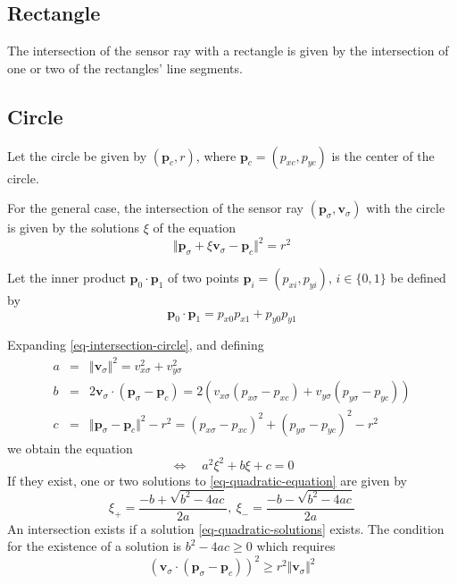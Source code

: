 \documentclass[11pt]{article}
\newcommand{\pb}{\mathbf{p}}
\newcommand{\pbc}{\mathbf{p}_c}
\newcommand{\pbsig}{\mathbf{p}_\sigma}
\newcommand{\pxc}{p_{xc}}
\newcommand{\pyc}{p_{yc}}
\newcommand{\pxsig}{p_{x\sigma}}
\newcommand{\pysig}{p_{y\sigma}}
\newcommand{\vbsig}{\mathbf{v}_\sigma}
\newcommand{\vxsig}{v_{x\sigma}}
\newcommand{\vysig}{v_{y\sigma}}
\begin{document}
\subsection{Rectangle}
\label{sec-intersection-rectangle}

The intersection of the sensor ray with a rectangle is given by the
intersection of one or two of the rectangles' line segments.

\subsection{Circle}
\label{sec-intersection-circle}
Let the circle be given by $(\pbc, r)$, where $\pbc=(\pxc, \pyc)$ is the 
center of the circle.

For the general case, the intersection of the sensor ray $(\pbsig, \vbsig)$
with the circle is given by the solutions $\xi$ of the equation
\begin{equation}
    \Vert\pbsig + \xi\vbsig - \pbc\Vert^2 = r^2\label{eq-intersection-circle}
\end{equation}

Let the inner product $\pb_0\cdot\pb_1$ of two points 
$\pb_i=(p_{xi},p_{yi}),\,i\in\{0,1\}$ be defined by
\begin{equation}
    \pb_0\cdot\pb_1 = p_{x0}p_{x1} + p_{y0}p_{y1}
\end{equation}

Expanding \eqref{eq-intersection-circle}, and defining
\begin{eqnarray}
    a &=& \Vert\vbsig\Vert^2 = \vxsig^2+\vysig^2 \\
    b &=& 2\vbsig\cdot(\pbsig-\pbc) = 
        2(\vxsig(\pxsig-\pxc)+\vysig(\pysig-\pyc)) \\
    c &=& \Vert\pbsig-\pbc\Vert^2 - r^2 = 
        (\pxsig-\pxc)^2 + (\pysig-\pyc)^2 - r^2
\end{eqnarray}
we obtain the equation
\begin{equation}
    \Leftrightarrow\quad a^2\xi^2 + b\xi + c = 0\label{eq-quadratic-equation}
\end{equation}
If they exist, one or two solutions to \eqref{eq-quadratic-equation} are 
given by
\begin{equation}
    \xi_+ = \frac{-b+\sqrt{b^2-4ac}}{2a},\:
    \xi_- = \frac{-b-\sqrt{b^2-4ac}}{2a}\label{eq-quadratic-solutions}
\end{equation}
An intersection exists if a solution \eqref{eq-quadratic-solutions} exists. The
condition for the existence of a solution is $b^2-4ac\geq0$ which requires
\begin{equation}
    (\vbsig\cdot(\pbsig-\pbc))^2 \geq r^2 \Vert\vbsig\Vert^2
    \label{eq-condition-intersection-circle}
\end{equation}
\end{document}
